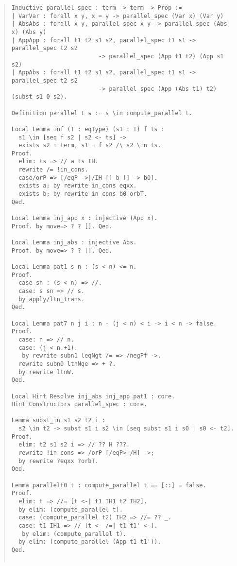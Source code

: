 \documentclass[12pt, titlepage]{ltjsarticle}
\begin{document}
\begin{quote}
\begin{verbatim}
Inductive parallel_spec : term -> term -> Prop :=
| VarVar : forall x y, x = y -> parallel_spec (Var x) (Var y)
| AbsAbs : forall x y, parallel_spec x y -> parallel_spec (Abs x) (Abs y)
| AppApp : forall t1 t2 s1 s2, parallel_spec t1 s1 -> parallel_spec t2 s2
                         -> parallel_spec (App t1 t2) (App s1 s2)
| AppAbs : forall t1 t2 s1 s2, parallel_spec t1 s1 -> parallel_spec t2 s2
                         -> parallel_spec (App (Abs t1) t2) (subst s1 0 s2).

Definition parallel t s := s \in compute_parallel t.

Local Lemma inf (T : eqType) (s1 : T) f ts :
  s1 \in [seq f s2 | s2 <- ts] ->
  exists s2 : term, s1 = f s2 /\ s2 \in ts.
Proof.
  elim: ts => // a ts IH.
  rewrite /= !in_cons.
  case/orP => [/eqP ->|/IH [] b [] -> b0].
  exists a; by rewrite in_cons eqxx.
  exists b; by rewrite in_cons b0 orbT.
Qed.

Local Lemma inj_app x : injective (App x).
Proof. by move=> ? ? []. Qed.

Local Lemma inj_abs : injective Abs.
Proof. by move=> ? ? []. Qed.

Local Lemma pat1 s n : (s < n) <= n.
Proof.
  case sn : (s < n) => //.
  case: s sn => // s.
  by apply/ltn_trans.
Qed.

Local Lemma pat7 n j i : n - (j < n) < i -> i < n -> false.
Proof.
  case: n => // n.
  case: (j < n.+1).
   by rewrite subn1 leqNgt /= => /negPf ->.
  rewrite subn0 ltnNge => + ?.
  by rewrite ltnW.
Qed.

Local Hint Resolve inj_abs inj_app pat1 : core.
Hint Constructors parallel_spec : core.

Lemma subst_in s1 s2 t2 i :
  s2 \in t2 -> subst s1 i s2 \in [seq subst s1 i s0 | s0 <- t2].
Proof.
  elim: t2 s1 s2 i => // ?? H ???.
  rewrite !in_cons => /orP [/eqP>|/H] ->;
  by rewrite ?eqxx ?orbT.
Qed.

Lemma parallelt0 t : compute_parallel t == [::] = false.
Proof.
  elim: t => //= [t <-| t1 IH1 t2 IH2].
  by elim: (compute_parallel t).
  case: (compute_parallel t2) IH2 => //= ?? _.
  case: t1 IH1 => // [t <- /=| t1 t1' <-].
   by elim: (compute_parallel t).
  by elim: (compute_parallel (App t1 t1')).
Qed.


\end{verbatim}
\end{quote}
\end{document}
